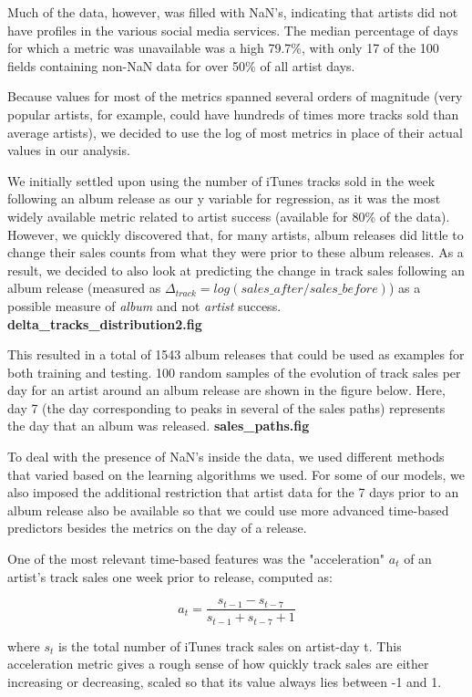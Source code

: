 \documentclass[conference]{IEEEtran}
\begin{document}
Much of the data, however, was filled with NaN's, indicating that artists did not have profiles in the various social media services. The median percentage of days for which a metric was unavailable was a high 79.7\%, with only 17 of the 100 fields containing non-NaN data for over 50\% of all artist days.

Because values for most of the metrics spanned several orders of magnitude (very popular artists, for example, could have hundreds of times more tracks sold than average artists), we decided to use the log of most metrics in place of their actual values in our analysis.

We initially settled upon using the number of iTunes tracks sold in the week following an album release as our y variable for regression, as it was the most widely available metric related to artist success (available for 80\% of the data). However, we quickly discovered that, for many artists, album releases did little to change their sales counts from what they were prior to these album releases. As a result, we decided to also look at predicting the change in track sales following an album release (measured as $\Delta_{track} = log(sales\_after/sales\_before)$) as a possible measure of \textit{album} and not \textit{artist} success. \textbf{delta\_tracks\_distribution2.fig}

This resulted in a total of 1543 album releases that could be used as examples for both training and testing. 100 random samples of the evolution of track sales per day for an artist around an album release are shown in the figure below. Here, day 7 (the day corresponding to peaks in several of the sales paths) represents the day that an album was released. \textbf{sales\_paths.fig}

To deal with the presence of NaN's inside the data, we used different methods that varied based on the learning algorithms we used. For some of our models, we also imposed the additional restriction that artist data for the 7 days prior to an album release also be available so that we could use more advanced time-based predictors besides the metrics on the day of a release.

One of the most relevant time-based features was the "acceleration" $a_t$ of an artist's track sales one week prior to release, computed as:

$$a_t = \frac{s_{t-1} - s_{t-7}}{s_{t-1} + s_{t-7} + 1}$$

where $s_t$ is the total number of iTunes track sales on artist-day t. This acceleration metric gives a rough sense of how quickly track sales are either increasing or decreasing, scaled so that its value always lies between -1 and 1.
\end{document}
